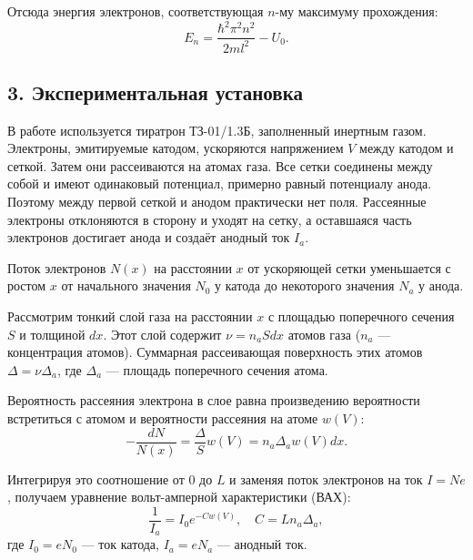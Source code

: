 \documentclass[12pt,a4paper]{article}
\begin{document}
Отсюда энергия электронов, соответствующая $n$-му максимуму прохождения:
\begin{equation}
    E_n = \frac{\hbar^2 \pi^2 n^2}{2ml^2} - U_0.
\end{equation}


\subsection*{3. Экспериментальная установка}
В работе используется тиратрон ТЗ-01/1.3Б, заполненный инертным газом. Электроны, эмитируемые катодом, ускоряются напряжением $V$ между катодом и сеткой. Затем они рассеиваются на атомах газа. Все сетки соединены между собой и имеют одинаковый потенциал, примерно равный потенциалу анода. Поэтому между первой сеткой и анодом практически нет поля. Рассеянные электроны отклоняются в сторону и уходят на сетку, а оставшаяся часть электронов достигает анода и создаёт анодный ток $I_a$.

Поток электронов $N(x)$ на расстоянии $x$ от ускоряющей сетки уменьшается с ростом $x$ от начального значения $N_0$ у катода до некоторого значения $N_a$ у анода.

Рассмотрим тонкий слой газа на расстоянии $x$ с площадью поперечного сечения $S$ и толщиной $dx$. Этот слой содержит $\nu = n_a S dx$ атомов газа ($n_a$ --- концентрация атомов). Суммарная рассеивающая поверхность этих атомов $\Delta = \nu \Delta_a$, где $\Delta_a$ --- площадь поперечного сечения атома.

Вероятность рассеяния электрона в слое равна произведению вероятности встретиться с атомом и вероятности рассеяния на атоме $w(V)$:
\begin{equation}
    -\frac{dN}{N(x)} = \frac{\Delta}{S} w(V) = n_a \Delta_a w(V) dx.
\end{equation}

Интегрируя это соотношение от $0$ до $L$ и заменяя поток электронов на ток $I = Ne$, получаем уравнение вольт-амперной характеристики (ВАХ):
\begin{equation}
    \frac{1}{I_a} = I_0 e^{-C w(V)}, \quad C = L n_a \Delta_a,
\end{equation}
где $I_0 = eN_0$ --- ток катода, $I_a = eN_a$ --- анодный ток.
\end{document}
